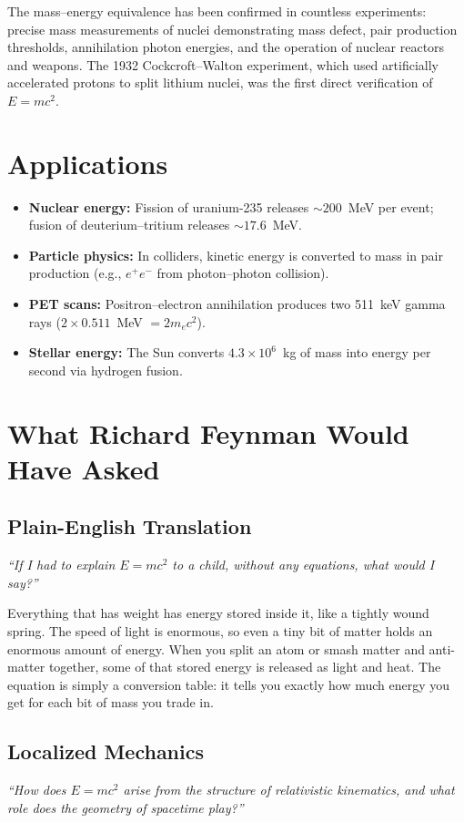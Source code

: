 The mass--energy equivalence has been confirmed in countless experiments: precise mass measurements of nuclei demonstrating mass defect, pair production thresholds, annihilation photon energies, and the operation of nuclear reactors and weapons. The 1932 Cockcroft--Walton experiment, which used artificially accelerated protons to split lithium nuclei, was the first direct verification of $E = mc^{2}$.
\section*{Applications}

\begin{itemize}
  \item \textbf{Nuclear energy:} Fission of uranium-235 releases $\sim 200$~MeV per event; fusion of deuterium--tritium releases $\sim 17.6$~MeV.
  \item \textbf{Particle physics:} In colliders, kinetic energy is converted to mass in pair production (e.g., $e^{+}e^{-}$ from photon--photon collision).
  \item \textbf{PET scans:} Positron--electron annihilation produces two 511~keV gamma rays ($2 \times 0.511$~MeV $= 2m_{e}c^{2}$).
  \item \textbf{Stellar energy:} The Sun converts $4.3 \times 10^{6}$~kg of mass into energy per second via hydrogen fusion.
\end{itemize}
\section*{What Richard Feynman Would Have Asked}

\subsection*{Plain-English Translation}
\textit{``If I had to explain $E = mc^{2}$ to a child, without any equations, what would I say?''}

Everything that has weight has energy stored inside it, like a tightly wound spring. The speed of light is enormous, so even a tiny bit of matter holds an enormous amount of energy. When you split an atom or smash matter and anti-matter together, some of that stored energy is released as light and heat. The equation is simply a conversion table: it tells you exactly how much energy you get for each bit of mass you trade in.

\subsection*{Localized Mechanics}
\textit{``How does $E = mc^{2}$ arise from the structure of relativistic kinematics, and what role does the geometry of spacetime play?''}

